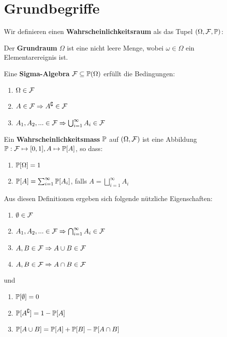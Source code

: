 \section{Grundbegriffe}

Wir definieren einen \textbf{Wahrscheinlichkeitsraum} als das Tupel $(\Omega, \mathcal{F}, \mathbb{P})$:

\begin{tcolorbox}
    Der \textbf{Grundraum} $\Omega$ ist eine nicht leere Menge, wobei $\omega \in \Omega$ ein Elementarereignis ist. \medskip
    
    Eine \textbf{Sigma-Algebra} $\mathcal{F} \subseteq \mathbb{P}(\Omega)$ erfüllt die Bedingungen:
    \begin{enumerate}
        \item $\Omega \in \mathcal{F}$
        \item $A \in \mathcal{F} \Rightarrow A^\complement \in \mathcal{F}$
        \item $A_1, A_2, ... \in \mathcal{F} \Rightarrow \bigcup^\infty_{i = 1} A_i \in \mathcal{F}$
    \end{enumerate} \medskip
    
    Ein \textbf{Wahrscheinlichkeitsmass} $\mathbb{P}$ auf $(\Omega, \mathcal{F})$ ist eine Abbildung $\mathbb{P} : \mathcal{F} \mapsto [0,1], A \mapsto \mathbb{P}[A]$, so dass:
    \begin{enumerate}
        \item $\mathbb{P}[\Omega] = 1$
        \item $\mathbb{P}[A] = \sum_{i=1}^\infty \mathbb{P}[A_i]$, falls $A = \bigsqcup_{i = 1}^\infty A_i$
    \end{enumerate}
\end{tcolorbox}

Aus diesen Definitionen ergeben sich folgende nützliche Eigenschaften:
\begin{enumerate}
    \item $\emptyset \in \mathcal{F}$
    \item $A_1, A_2, ... \in \mathcal{F} \Rightarrow \bigcap_{i = 1}^\infty A_i \in \mathcal{F}$
    \item $A, B \in \mathcal{F} \Rightarrow A \cup B \in \mathcal{F}$
    \item $A, B \in \mathcal{F} \Rightarrow A \cap B \in \mathcal{F}$
\end{enumerate}
und
\begin{enumerate}
    \item $\mathbb{P}[\emptyset] = 0$
    \item $\mathbb{P}[A^\complement] = 1 - \mathbb{P}[A]$
    \item $\mathbb{P}[A \cup B] = \mathbb{P}[A] + \mathbb{P}[B] - \mathbb{P}[A \cap B]$
\end{enumerate}


